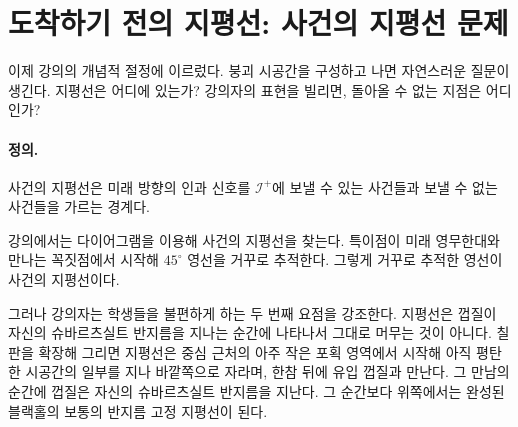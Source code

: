 \begin{classroomqa}
\end{classroomqa}

\section{도착하기 전의 지평선: 사건의 지평선 문제}

이제 강의의 개념적 절정에 이르렀다. 붕괴 시공간을 구성하고 나면 자연스러운 질문이 생긴다. 지평선은 어디에 있는가? 강의자의 표현을 빌리면, 돌아올 수 없는 지점은 어디인가?

\paragraph{정의.} 사건의 지평선은 미래 방향의 인과 신호를 \(\mathcal{I}^+\)에 보낼 수 있는 사건들과 보낼 수 없는 사건들을 가르는 경계다.

강의에서는 다이어그램을 이용해 사건의 지평선을 찾는다. 특이점이 미래 영무한대와 만나는 꼭짓점에서 시작해 \(45^\circ\) 영선을 거꾸로 추적한다. 그렇게 거꾸로 추적한 영선이 사건의 지평선이다.

그러나 강의자는 학생들을 불편하게 하는 두 번째 요점을 강조한다. 지평선은 껍질이 자신의 슈바르츠실트 반지름을 지나는 순간에 나타나서 그대로 머무는 것이 아니다. 칠판을 확장해 그리면 지평선은 중심 근처의 아주 작은 포획 영역에서 시작해 아직 평탄한 시공간의 일부를 지나 바깥쪽으로 자라며, 한참 뒤에 유입 껍질과 만난다. 그 만남의 순간에 껍질은 자신의 슈바르츠실트 반지름을 지난다. 그 순간보다 위쪽에서는 완성된 블랙홀의 보통의 반지름 고정 지평선이 된다.

